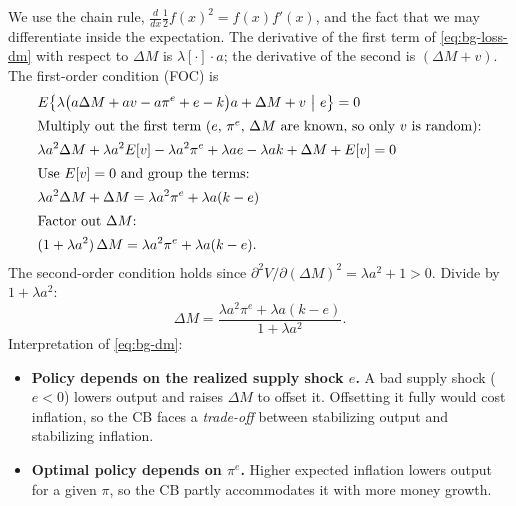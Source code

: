 We use the chain rule, $\frac{d}{dx}\tfrac12 f(x)^2=f(x)f'(x)$, and the fact that we may differentiate inside the expectation. The derivative of the first term of \eqref{eq:bg-loss-dm} with respect to $\Delta M$ is $\lambda[\cdot]\cdot a$; the derivative of the second is $(\Delta M+v)$. The first-order condition (FOC) is
\begin{align*}
&E\big\{\lambda\big(a\Delta M+av-a\pi^e+e-k\big)a+\Delta M+v\ \big|\ e\big\}=0\\
\intertext{Multiply out the first term ($e$, $\pi^e$, $\Delta M$ are known, so only $v$ is random):}
&\lambda a^2\Delta M+\lambda a^2E[v]-\lambda a^2\pi^e+\lambda a e-\lambda a k+\Delta M+E[v]=0\\
\intertext{Use $E[v]=0$ and group the terms:}
&\lambda a^2\Delta M+\Delta M=\lambda a^2\pi^e+\lambda a(k-e)\\
\intertext{Factor out $\Delta M$:}
&(1+\lambda a^2)\,\Delta M=\lambda a^2\pi^e+\lambda a(k-e).
\end{align*}
The second-order condition holds since $\partial^2 V/\partial(\Delta M)^2=\lambda a^2+1>0$. Divide by $1+\lambda a^2$:
\begin{equation}
\Delta M=\frac{\lambda a^2\pi^e+\lambda a(k-e)}{1+\lambda a^2}.\label{eq:bg-dm}
\end{equation}
Interpretation of \eqref{eq:bg-dm}:
\begin{itemize}
  \item \textbf{Policy depends on the realized supply shock $e$.} A bad supply shock ($e<0$) lowers output and raises $\Delta M$ to offset it. Offsetting it fully would cost inflation, so the CB faces a \emph{trade-off} between stabilizing output and stabilizing inflation.
  \item \textbf{Optimal policy depends on $\pi^e$.} Higher expected inflation lowers output for a given $\pi$, so the CB partly accommodates it with more money growth.
\end{itemize}

